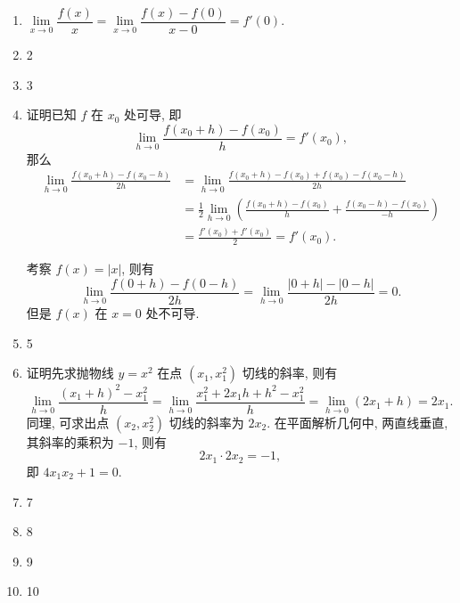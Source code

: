 \documentclass[a4paper, 11pt]{ctexart}
\begin{document}
\pagestyle{empty}
\begin{enumerate}
    \item %
        $\lim\limits_{x\to0}\dfrac{f(x)}{x} = \lim\limits_{x\to0}\dfrac{f(x) - f(0)}{x - 0} = f'(0)$.
    \item 2
    \item 3
    \item %
        {\heiti 证明}\quad 已知 $f$ 在 $x_0$ 处可导, 即
        \[
            \lim_{h\to0}\frac{f(x_0 + h) - f(x_0)}{h} = f'(x_0),    
        \]
        那么
        \begin{align*}
            \lim_{h\to0}\frac{f(x_0+h) - f(x_0-h)}{2h} &= \lim_{h\to0}\frac{f(x_0+h) - f(x_0) + f(x_0) - f(x_0 - h)}{2h} \\
                                                         &= \frac12\lim_{h\to0}\left(\frac{f(x_0+h) - f(x_0)}{h} + \frac{f(x_0 - h) - f(x_0)}{-h}\right) \\
                                                         &= \frac{f'(x_0) + f'(x_0)}{2} = f'(x_0).
        \end{align*}

        考察 $f(x) = |x|$, 则有
        \[
            \lim_{h\to0}\frac{f(0+h) - f(0-h)}{2h} = \lim_{h\to0}\frac{|0+h| - |0-h|}{2h} = 0.
        \]
        但是 $f(x)$ 在 $x = 0$ 处不可导.
    \item 5
    \item %
        {\heiti 证明}\quad 先求抛物线 $y = x^2$ 在点 $(x_1, x_1^2)$ 切线的斜率, 则有
        \[
            \lim_{h\to0}\frac{(x_1+h)^2 - x_1^2}{h} = \lim_{h\to0}\frac{x_1^2 + 2x_1h + h^2 - x_1^2}{h} = \lim_{h\to0}(2x_1 + h) = 2x_1.    
        \]
        同理, 可求出点 $(x_2, x_2^2)$ 切线的斜率为 $2x_2$. 在平面解析几何中, 两直线垂直, 其斜率的乘积为 $-1$, 则有
        \[
            2x_1\cdot2x_2 = -1,    
        \]
        即 $4x_1x_2 + 1 = 0$.
    \item 7
    \item 8
    \item 9
    \item 10
\end{enumerate}
\end{document}
